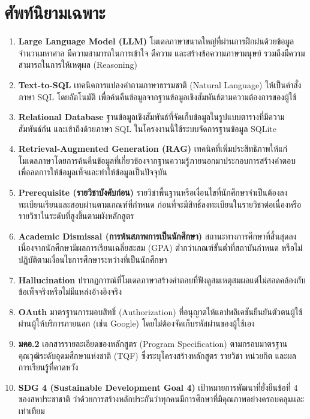 \section{ศัพท์นิยามเฉพาะ}

\begin{enumerate}
    \item \textbf{Large Language Model (LLM)} โมเดลภาษาขนาดใหญ่ที่ผ่านการฝึกฝนด้วยข้อมูลจำนวนมหาศาล มีความสามารถในการเข้าใจ ตีความ และสร้างข้อความภาษามนุษย์ รวมถึงมีความสามารถในการให้เหตุผล (Reasoning)
    \item \textbf{Text-to-SQL} เทคนิคการแปลงคำถามภาษาธรรมชาติ (Natural Language) ให้เป็นคำสั่งภาษา SQL โดยอัตโนมัติ เพื่อค้นคืนข้อมูลจากฐานข้อมูลเชิงสัมพันธ์ตามความต้องการของผู้ใช้
    \item \textbf{Relational Database} ฐานข้อมูลเชิงสัมพันธ์ที่จัดเก็บข้อมูลในรูปแบบตารางที่มีความสัมพันธ์กัน และเข้าถึงด้วยภาษา SQL ในโครงงานนี้ใช้ระบบจัดการฐานข้อมูล SQLite
    \item \textbf{Retrieval-Augmented Generation (RAG)} เทคนิคที่เพิ่มประสิทธิภาพให้แก่โมเดลภาษาโดยการค้นคืนข้อมูลที่เกี่ยวข้องจากฐานความรู้ภายนอกมาประกอบการสร้างคำตอบ เพื่อลดการให้ข้อมูลเท็จและทำให้ข้อมูลเป็นปัจจุบัน
    \item \textbf{Prerequisite (รายวิชาบังคับก่อน)} รายวิชาพื้นฐานหรือเงื่อนไขที่นักศึกษาจำเป็นต้องลงทะเบียนเรียนและสอบผ่านตามเกณฑ์ที่กำหนด ก่อนที่จะมีสิทธิ์ลงทะเบียนในรายวิชาต่อเนื่องหรือรายวิชาในระดับที่สูงขึ้นตามผังหลักสูตร
    \item \textbf{Academic Dismissal (การพ้นสภาพการเป็นนักศึกษา)} สถานะทางการศึกษาที่สิ้นสุดลงเนื่องจากนักศึกษามีผลการเรียนเฉลี่ยสะสม (GPA) ต่ำกว่าเกณฑ์ขั้นต่ำที่สถาบันกำหนด หรือไม่ปฏิบัติตามเงื่อนไขการศึกษาระหว่างที่เป็นนักศึกษา
    \item \textbf{Hallucination} ปรากฏการณ์ที่โมเดลภาษาสร้างคำตอบที่ฟังดูสมเหตุสมผลแต่ไม่สอดคล้องกับข้อเท็จจริงหรือไม่มีแหล่งอ้างอิงจริง
    \item \textbf{OAuth} มาตรฐานการมอบสิทธิ์ (Authorization) ที่อนุญาตให้แอปพลิเคชันยืนยันตัวตนผู้ใช้ผ่านผู้ให้บริการภายนอก (เช่น Google) โดยไม่ต้องจัดเก็บรหัสผ่านของผู้ใช้เอง
    \item \textbf{มคอ.2} เอกสารรายละเอียดของหลักสูตร (Program Specification) ตามกรอบมาตรฐานคุณวุฒิระดับอุดมศึกษาแห่งชาติ (TQF) ซึ่งระบุโครงสร้างหลักสูตร รายวิชา หน่วยกิต และผลการเรียนรู้ที่คาดหวัง
    \item \textbf{SDG 4 (Sustainable Development Goal 4)} เป้าหมายการพัฒนาที่ยั่งยืนข้อที่ 4 ของสหประชาชาติ ว่าด้วยการสร้างหลักประกันว่าทุกคนมีการศึกษาที่มีคุณภาพอย่างครอบคลุมและเท่าเทียม
\end{enumerate}
